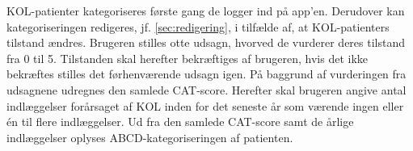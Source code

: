 \noindent
KOL-patienter kategoriseres første gang de logger ind på app'en. Derudover kan kategoriseringen redigeres, jf. \autoref{sec:redigering}, i tilfælde af, at KOL-patienters tilstand ændres.
Brugeren stilles otte udsagn, hvorved de vurderer deres tilstand fra 0 til 5. Tilstanden skal herefter bekræftiges af brugeren, hvis det ikke bekræftes stilles det førhenværende udsagn igen. På baggrund af vurderingen fra udsagnene udregnes den samlede CAT-score. Herefter skal brugeren angive antal indlæggelser forårsaget af KOL inden for det seneste år som værende ingen eller én til flere indlæggelser. Ud fra den samlede CAT-score samt de årlige indlæggelser oplyses ABCD-kategoriseringen af patienten. 